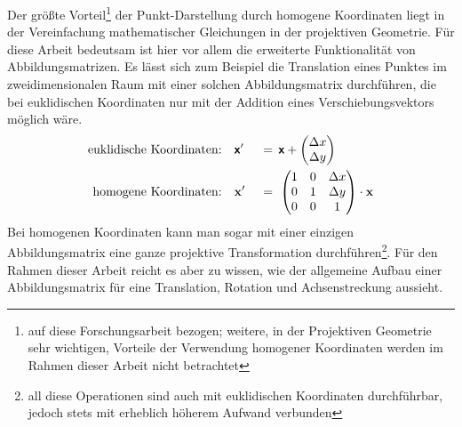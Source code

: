 Der größte Vorteil\footnote{auf diese Forschungsarbeit bezogen; weitere, in der Projektiven Geometrie sehr wichtigen, Vorteile der Verwendung homogener Koordinaten werden im Rahmen dieser Arbeit nicht betrachtet} der Punkt-Darstellung durch homogene Koordinaten liegt in der Vereinfachung mathematischer Gleichungen in der projektiven Geometrie. Für diese Arbeit bedeutsam ist hier vor allem die erweiterte Funktionalität von Abbildungsmatrizen. Es lässt sich zum Beispiel die Translation eines Punktes im zweidimensionalen Raum mit einer solchen Abbildungsmatrix durchführen, die bei euklidischen Koordinaten nur mit der Addition eines Verschiebungsvektors möglich wäre. %
\begin{alignat}{4}
		\text{euklidische Koordinaten:}\quad & \boldsymbol{\mathsf{x}}' & \:\:=\:\: & \boldsymbol{\mathsf{x}}+\begin{pmatrix}{\Delta}x\\{\Delta}y\\\end{pmatrix}\\
		\text{homogene Koordinaten:}\quad & \boldsymbol{\mathrm{x}}' & \:\:=\:\: & \begin{pmatrix}1&0&{\Delta}x\\0&1&{\Delta}y\\0&0&1\end{pmatrix}\cdot\boldsymbol{\mathrm{x}}
\end{alignat}
{\noindent}Bei homogenen Koordinaten kann man sogar mit einer einzigen Abbildungsmatrix eine ganze projektive Transformation durchführen\footnote{all diese Operationen sind auch mit euklidischen Koordinaten durchführbar, jedoch stets mit erheblich höherem Aufwand verbunden}. Für den Rahmen dieser Arbeit reicht es aber zu wissen, wie der allgemeine Aufbau einer Abbildungsmatrix für eine Translation, Rotation und Achsenstreckung aussieht.

